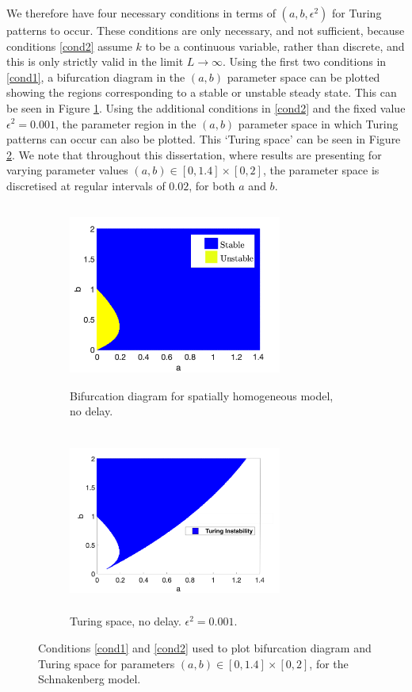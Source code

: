 We therefore have four necessary conditions in terms of $(a,b,\epsilon^2)$ for Turing patterns to occur. These conditions are only necessary, and not sufficient, because conditions \eqref{cond2} assume $k$ to be a continuous variable, rather than discrete, and this is only strictly valid in the limit $L\to\infty$. Using the first two conditions in \eqref{cond1}, a bifurcation diagram in the $(a,b)$ parameter space can be plotted showing the regions corresponding to a stable or unstable steady state. This can be seen in Figure \ref{fig:bifsh}. Using the additional conditions in \eqref{cond2} and the fixed value $\epsilon^2=0.001$, the parameter region in the $(a,b)$ parameter space in which Turing patterns can occur can also be plotted. This `Turing space' can be seen in Figure \ref{fig:turingspace}. We note that throughout this dissertation, where results are presenting for varying parameter values $(a,b)\in[0,1.4]\times[0,2]$, the parameter space is discretised at regular intervals of $0.02$, for both $a$ and $b$.

\begin{figure}[H]
    \centering
    \begin{subfigure}[t]{0.45\textwidth}
        \centering
        \includegraphics[width=7cm,height = 6cm]{bifsh1.png}
        \caption{Bifurcation diagram for spatially homogeneous model, no delay.}
        \label{fig:bifsh}
    \end{subfigure}
    \hfill
    \begin{subfigure}[t]{0.45\textwidth}
        \centering
        \includegraphics[width=7cm,height = 6cm]{turingspace.png}
        \caption{Turing space, no delay. $\epsilon^2=0.001$.}
        \label{fig:turingspace}
    \end{subfigure}
    \caption{Conditions \eqref{cond1} and \eqref{cond2} used to plot bifurcation diagram and Turing space for parameters $(a,b)\in[0,1.4]\times[0,2]$, for the Schnakenberg model.}
    \label{fig:dispfixed}
\end{figure}

